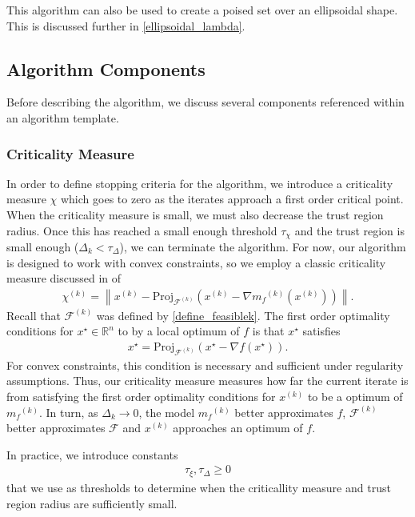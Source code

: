 \documentclass{article}
\theoremstyle{case}
\numberwithin{theorem}{subsection}
\newcommand{\chik}{{\chi^{(k)}}}
\newcommand{\dk}{\Delta_k}
\newcommand{\feasiblek}{{\mathcal F^{(k)}}}
\newcommand{\feasible}{{\mathcal F}}
\newcommand{\gradf}{\nabla f}
\newcommand{\mfk}{{{m}_f}^{(k)}}
\newcommand{\Rn}{\mathbb R^n}
\newcommand{\tolcrit}{\tau_{\xi}}
\newcommand{\tolrad}{\tau_{\Delta}}
\newcommand{\xk}{x^{(k)}}
\begin{document}
This algorithm can also be used to create a poised set over an ellipsoidal shape.
This is discussed further in \cref{ellipsoidal_lambda}.



\subsection{Algorithm Components}

Before describing the algorithm, we discuss several components referenced within an algorithm template.

\subsubsection{Criticality Measure}

In order to define stopping criteria for the algorithm, we introduce a criticality measure $\chi$ which goes to zero as the iterates approach a first order critical point.
When the criticality measure is small, we must also decrease the trust region radius.
Once this has reached a small enough threshold $\tau_{\chi}$ and the trust region is small enough ($\Delta_k < \tau_{\Delta}$), we can terminate the algorithm.
For now, our algorithm is designed to work with convex constraints, so we employ a classic criticality measure discussed in \cite{ConnGoulToin00} of
\begin{align}
\label{define_criticality_measure}
\chik = \left\|\xk - \text{Proj}_{\feasiblek}\left(\xk- \nabla \mfk\left(\xk\right)\right)\right\|.
\end{align}
Recall that $\feasiblek$ was defined by \cref{define_feasiblek}.
The first order optimality conditions for $x^{\star} \in \Rn$ to by a local optimum of $f$ is that $x^{\star}$ satisfies
\begin{align*}
x^{\star} = \text{Proj}_{\feasiblek}\left(x^{\star} - \gradf(x^{\star})\right).
\end{align*}
For convex constraints, this condition is necessary and sufficient under regularity assumptions.
Thus, our criticality measure measures how far the current iterate is from satisfying the first order optimality conditions for $\xk$ to be a optimum of $\mfk$.
In turn, as $\dk \to 0$, the model $\mfk$ better approximates $f$, $\feasiblek$ better approximates $\feasible$ and $\xk$ approaches an optimum of $f$.

In practice, we introduce constants 
\begin{align}
            \tolcrit, \tolrad \ge 0 \label{define_algorithm_tolerances}
\end{align}
that we use as thresholds to determine when the criticallity measure and trust region radius are sufficiently small.
\end{document}
